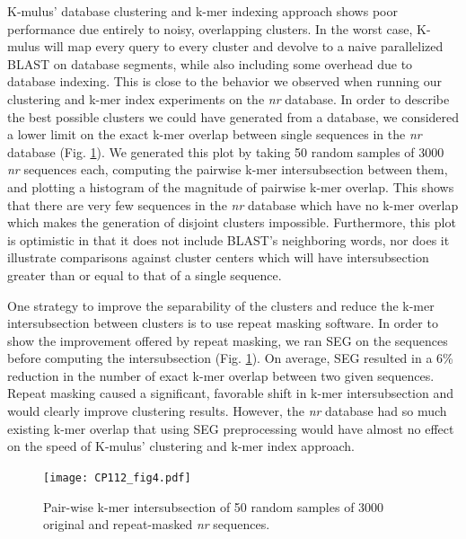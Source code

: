 \documentclass[12pt,\mydriver]{thesis}
\begin{document}
K-mulus' database clustering and k-mer indexing approach shows poor performance due entirely to noisy, overlapping clusters. In the worst case, K-mulus will map every query to every cluster and devolve to a naive parallelized BLAST on database segments, while also including some overhead due to database indexing. This is close to the behavior we observed when running our clustering and k-mer index experiments on the \emph{nr} database. In order to describe the best possible clusters we could have generated from a database, we considered a lower limit on the exact k-mer overlap between single sequences in the \emph{nr} database (Fig. \ref{fig:kmer_intersubsection}). We generated this plot by taking 50 random samples of 3000 \emph{nr} sequences each, computing the pairwise k-mer intersubsection between them, and plotting a histogram of the magnitude of pairwise k-mer overlap. This shows that there are very few sequences in the \emph{nr} database which have no k-mer overlap which makes the generation of disjoint clusters impossible. Furthermore, this plot is optimistic in that it does not include BLAST’s neighboring words, nor does it illustrate comparisons against cluster centers which will have intersubsection greater than or equal to that of a single sequence.

One strategy to improve the separability of the clusters and reduce the k-mer intersubsection between clusters is to use repeat masking software.
In order to show the improvement offered by repeat masking, we ran SEG\cite{wootton1993statistics} on the sequences before computing the intersubsection (Fig. \ref{fig:kmer_intersubsection}). On average, SEG resulted in a 6\% reduction in the number of exact k-mer overlap between two given sequences. Repeat masking caused a significant, favorable shift in k-mer intersubsection and would clearly improve clustering results. However, the \emph{nr} database had so much existing k-mer overlap that using SEG preprocessing would have almost no effect on the speed of K-mulus' clustering and k-mer index approach.

\begin{figure}[!htb]\begin{center}
\texttt{[image: CP112\_fig4.pdf]}
\end{center}
\renewcommand{\baselinestretch}{1}
\small\normalsize
\begin{quote}
  \caption[Pair-wise k-mer intersubsection of 50 random samples of 3000 original and repeat-masked \emph{nr} sequences]{Pair-wise k-mer intersubsection of 50 random samples of 3000 original and repeat-masked \emph{nr} sequences.}
  \label{fig:kmer_intersubsection}
\end{quote}
\end{figure}
\renewcommand{\baselinestretch}{2}
\small\normalsize
\end{document}
